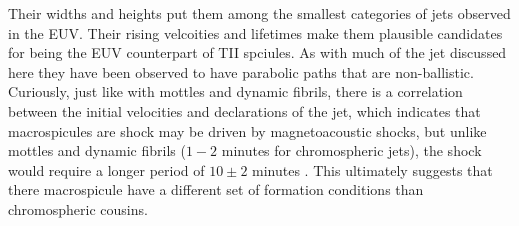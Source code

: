 \documentclass[12pt]{ociamthesis}
\newcommand{\kms}{~\rm{km ~s^{-1}}}
\begin{document}
%
Their widths and heights put them among the smallest categories of jets observed in the EUV. Their rising velcoities and lifetimes make them plausible candidates for being the EUV counterpart of TII spciules. As with much of the jet discussed here they have been observed to have parabolic paths that are non-ballistic. Curiously, just like with mottles and dynamic fibrils, there is a correlation between the initial velocities and declarations of the jet, which indicates that macrospicules are shock may be driven by magnetoacoustic shocks, but unlike mottles and dynamic fibrils ($1-2$ minutes for chromospheric jets), the shock would require a longer period of $10\pm 2$ minutes \cite{Loboda2019ApJ871230L}. This ultimately suggests that there macrospicule have a different set of formation conditions than chromospheric cousins.
\end{document}
